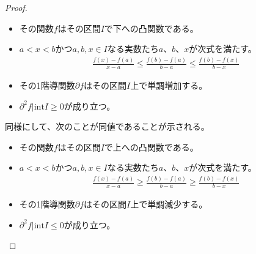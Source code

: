 \documentclass[dvipdfmx]{jsarticle}
\begin{document}
\begin{proof}
\begin{itemize}
\item
  その関数$f$はその区間$I$で下への凸関数である。
\item
  $a < x < b$かつ$a,b,x \in I$なる実数たち$a$、$b$、$x$が次式を満たす。
\begin{align*}
\frac{f(x) - f(a)}{x - a} \leq \frac{f(b) - f(a)}{b - a} \leq \frac{f(b) - f(x)}{b - x}
\end{align*}
\item
  その1階導関数$\partial f$はその区間$I$上で単調増加する。
\item
  $\partial^{2}f|\mathrm{int}I \geq 0$が成り立つ。
\end{itemize}
同様にして、次のことが同値であることが示される。
\begin{itemize}
\item
  その関数$f$はその区間$I$で上への凸関数である。
\item
  $a < x < b$かつ$a,b,x \in I$なる実数たち$a$、$b$、$x$が次式を満たす。
\begin{align*}
\frac{f(x) - f(a)}{x - a} \geq \frac{f(b) - f(a)}{b - a} \geq \frac{f(b) - f(x)}{b - x}
\end{align*}
\item
  その1階導関数$\partial f$はその区間$I$上で単調減少する。
\item
  $\partial^{2}f|\mathrm{int}I \leq 0$が成り立つ。
\end{itemize}
\end{proof}
\end{document}
